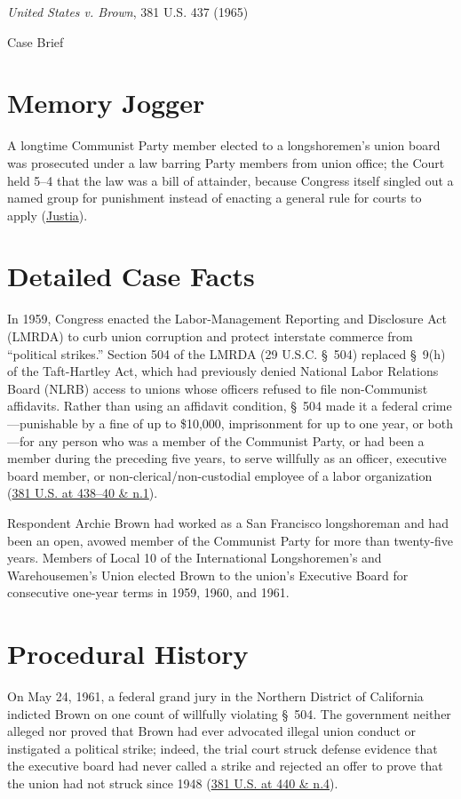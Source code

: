 \documentclass[12pt]{article}
\begin{document}
\begin{center}
{\LARGE \textit{United States v. Brown}, 381 U.S. 437 (1965)\par}
\vspace{0.8em}
{\large Case Brief\par}
\end{center}
\vspace{1em}

\section{Memory Jogger}
A longtime Communist Party member elected to a longshoremen's union board was prosecuted under a law barring Party members from union office; the Court held 5--4 that the law was a bill of attainder, because Congress itself singled out a named group for punishment instead of enacting a general rule for courts to apply (\href{https://supreme.justia.com/cases/federal/us/381/437/}{Justia}).

\section{Detailed Case Facts}
In 1959, Congress enacted the Labor-Management Reporting and Disclosure Act (LMRDA) to curb union corruption and protect interstate commerce from ``political strikes.'' Section 504 of the LMRDA (29 U.S.C. \S~504) replaced \S~9(h) of the Taft-Hartley Act, which had previously denied National Labor Relations Board (NLRB) access to unions whose officers refused to file non-Communist affidavits. Rather than using an affidavit condition, \S~504 made it a federal crime---punishable by a fine of up to \$10,000, imprisonment for up to one year, or both---for any person who was a member of the Communist Party, or had been a member during the preceding five years, to serve willfully as an officer, executive board member, or non-clerical/non-custodial employee of a labor organization (\href{https://supreme.justia.com/cases/federal/us/381/437/}{381 U.S. at 438--40 \& n.1}).

Respondent Archie Brown had worked as a San Francisco longshoreman and had been an open, avowed member of the Communist Party for more than twenty-five years. Members of Local 10 of the International Longshoremen's and Warehousemen's Union elected Brown to the union's Executive Board for consecutive one-year terms in 1959, 1960, and 1961.

\section{Procedural History}
On May 24, 1961, a federal grand jury in the Northern District of California indicted Brown on one count of willfully violating \S~504. The government neither alleged nor proved that Brown had ever advocated illegal union conduct or instigated a political strike; indeed, the trial court struck defense evidence that the executive board had never called a strike and rejected an offer to prove that the union had not struck since 1948 (\href{https://supreme.justia.com/cases/federal/us/381/437/}{381 U.S. at 440 \& n.4}).
\end{document}
